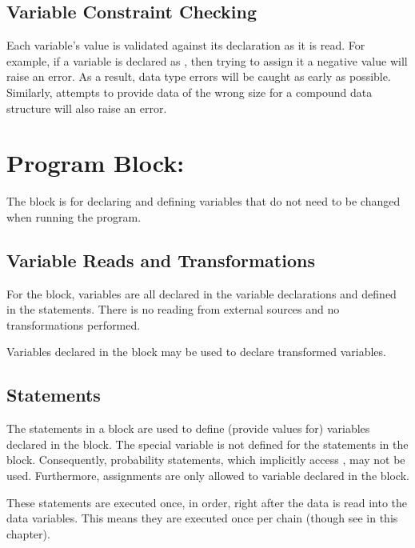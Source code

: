 \subsection{Variable Constraint Checking}

Each variable's value is validated against its declaration as it is
read.  For example, if a variable  is declared as
, then trying to assign it a negative value will raise
an error.  As a result, data type errors will be caught as early as
possible.  Similarly, attempts to provide data of the wrong size for a
compound data structure will also raise an error.


\section{Program Block: }

The  block is for declaring and defining
variables that do not need to be changed when running the program.  

\subsection{Variable Reads and Transformations}

For the  block, variables are all declared in
the variable declarations and defined in the statements.  There is no
reading from external sources and no transformations performed.

Variables declared in the  block may be used to declare
transformed variables.

\subsection{Statements}

The statements in a  block are used to define
(provide values for) variables declared in the 
block.  The special variable  is not defined for the
statements in the  block.  Consequently,
probability statements, which implicitly access , may not
be used.  Furthermore, assignments are only allowed to variable
declared in the  block.

These statements are executed once, in order, right after the data is
read into the data variables.  This means they are executed once per
chain (though see  in this chapter).

